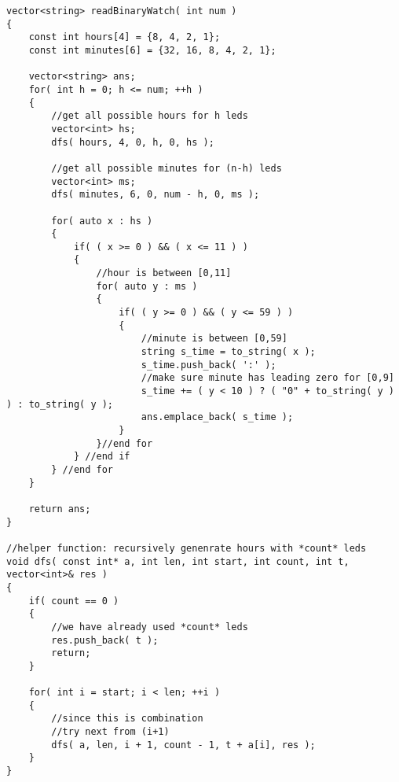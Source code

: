 \setcounter{lstlisting}{0}
\begin{lstlisting}[style=customc, caption={Combination}]
vector<string> readBinaryWatch( int num )
{
    const int hours[4] = {8, 4, 2, 1};
    const int minutes[6] = {32, 16, 8, 4, 2, 1};

    vector<string> ans;
    for( int h = 0; h <= num; ++h )
    {
        //get all possible hours for h leds
        vector<int> hs;
        dfs( hours, 4, 0, h, 0, hs );

        //get all possible minutes for (n-h) leds
        vector<int> ms;
        dfs( minutes, 6, 0, num - h, 0, ms );

        for( auto x : hs )
        {
            if( ( x >= 0 ) && ( x <= 11 ) )
            {
                //hour is between [0,11]
                for( auto y : ms )
                {
                    if( ( y >= 0 ) && ( y <= 59 ) )
                    {
                        //minute is between [0,59]
                        string s_time = to_string( x );
                        s_time.push_back( ':' );
                        //make sure minute has leading zero for [0,9]
                        s_time += ( y < 10 ) ? ( "0" + to_string( y ) ) : to_string( y );
                        ans.emplace_back( s_time );
                    }
                }//end for
            } //end if
        } //end for
    }

    return ans;
}

//helper function: recursively genenrate hours with *count* leds
void dfs( const int* a, int len, int start, int count, int t, vector<int>& res )
{
    if( count == 0 )
    {
        //we have already used *count* leds
        res.push_back( t );
        return;
    }

    for( int i = start; i < len; ++i )
    {
        //since this is combination
        //try next from (i+1)
        dfs( a, len, i + 1, count - 1, t + a[i], res );
    }
}
\end{lstlisting}